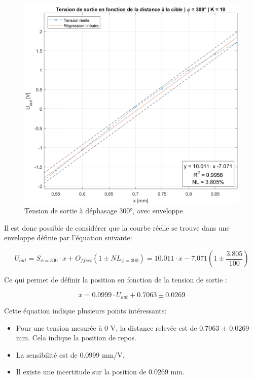 \begin{figure}[H]
    \centering
    \includegraphics[width=15cm]{Images/Seance5/u_out_enveloppe.png}
    \caption{Tension de sortie à déphasage 300°, avec enveloppe}
    \label{fig:uoutblblb}
\end{figure}


Il est donc possible de considérer que la courbe réelle se trouve dans une enveloppe définie par
l'équation suivante:

\begin{equation}
    U_{out} =  S_{\phi =300} \cdot x + O_{ffset} (1 \pm NL_{\phi =300}) = 10.011\cdot x - 7.071(1 \pm \frac{3.805}{100})
\label{eq:1234}
\end{equation}

Ce qui permet de définir la position en fonction de la tension de sortie :

\begin{equation}
    x = 0.0999 \cdot U_{out}+ 0.7063 \pm 0.0269
    \label{eq:234}
\end{equation}

Cette équation indique plusieurs points intéressants:
\begin{itemize}
    \item Pour une tension mesurée à 0 V, la distance relevée est de 0.7063 $\pm$ 0.0269 mm. Cela
         indique la position de repos.
    \item La sensibilité est de 0.0999 mm/V.
    \item Il existe une incertitude sur la position de 0.0269 mm. 
\end{itemize}
\vspace{0.2cm}

